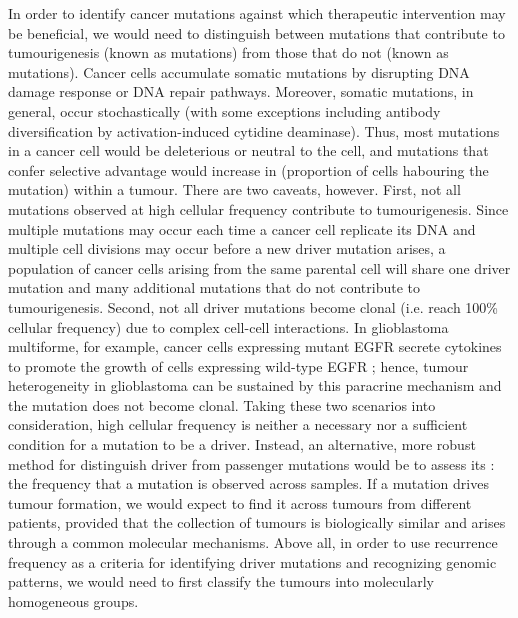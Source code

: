 In order to identify cancer mutations against which therapeutic intervention may be beneficial, we would need to distinguish between mutations that contribute to tumourigenesis (known as  mutations) from those that do not (known as  mutations). Cancer cells accumulate somatic mutations by disrupting DNA damage response or DNA repair pathways. Moreover, somatic mutations, in general, occur stochastically (with some exceptions including antibody diversification by activation-induced cytidine deaminase). Thus, most mutations in a cancer cell would be deleterious or neutral to the cell, and mutations that confer selective advantage would increase in  (proportion of cells habouring the mutation) within a tumour. There are two caveats, however. First, not all mutations observed at high cellular frequency contribute to tumourigenesis. Since multiple mutations may occur each time a cancer cell replicate its DNA and multiple cell divisions may occur before a new driver mutation arises, a population of cancer cells arising from the same parental cell will share one driver mutation and many additional mutations that do not contribute to tumourigenesis. Second, not all driver mutations become clonal (i.e. reach 100\% cellular frequency) due to complex cell-cell interactions. In glioblastoma multiforme, for example, cancer cells expressing mutant EGFR secrete cytokines to promote the growth of cells expressing wild-type EGFR ; hence, tumour heterogeneity in glioblastoma can be sustained by this paracrine mechanism and the  mutation does not become clonal. Taking these two scenarios into consideration, high cellular frequency is neither a necessary nor a sufficient condition for a mutation to be a driver. Instead, an alternative, more robust method for distinguish driver from passenger mutations would be to assess its : the frequency that a mutation is observed across samples. If a mutation drives tumour formation, we would expect to find it across tumours from different patients, provided that the collection of tumours is biologically similar and arises through a common molecular mechanisms. Above all, in order to use recurrence frequency as a criteria for identifying driver mutations and recognizing genomic patterns, we would need to first classify the tumours into molecularly homogeneous groups.

